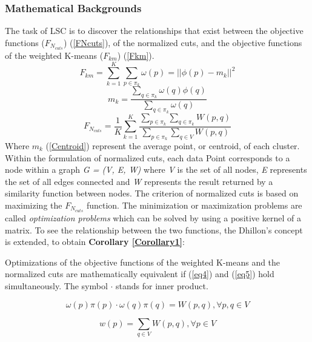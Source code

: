 \subsubsection{Mathematical Backgrounds}
The task of LSC is to discover the relationships that exist between the objective 
functions ($ F_{N_{cuts}} $) (\ref{FNcuts}), of the normalized cuts, and the objective functions 
of the weighted K-means ($ F_{km}$) (\ref{Fkm}). 
\begin{equation} \label{Fkm}
    F_{km} = \sum_{k=1}^K\sum_{p\in\pi_k}\omega(p)= || \phi(p)-m_k ||^2 
\end{equation}
\begin{equation} \label{Centroid}
    m_k = \frac{\sum_{q\in\pi_k}\omega(q)\phi(q)}{\sum_{q\in\pi_k}\omega(q)}
\end{equation}
\begin{equation} \label{FNcuts}
    F_{N_{cuts}} = \frac{1}{K}\sum_{k=1}^K\frac{\sum_{p\in\pi_k}\sum_{q\in\pi_k}W(p,q)}{\sum_{p\in\pi_k}\sum_{q\in{V}}W(p,q)}
\end{equation}
Where $ m_k $ (\ref{Centroid}) represent the average point, or centroid, of each cluster. Within 
the formulation of normalized cuts, each data Point corresponds to a node 
within a graph \emph{G = (V, E, W)} where \emph{V} is the set of all nodes, \emph{E} represents 
the set of all edges connected and \emph{W} represents the result returned by a 
similarity function between nodes. The criterion of normalized cuts is based 
on maximizing the $ F_{N_{cuts}} $ function. The minimization or maximization problems 
are called \emph{optimization problems} which can be solved by using a positive kernel of 
a matrix. To see the relationship between the two functions, the Dhillon's concept \cite{0781426526} is extended, to obtain {\bfseries Corollary \ref{Corollary1}}:

\begin{corollary} \label{Corollary1}
    Optimizations of the objective functions of the weighted K-means
    and the normalized cuts are mathematically equivalent if (\ref{eq4}) and (\ref{eq5}) 
    hold simultaneously. The symbol $ \cdot $ stands for inner product.
\end{corollary}

\begin{equation} \label{eq4}
    \omega(p)\pi(p) \cdot \omega(q)\pi(q) = W(p,q), \forall p,q \in V
\end{equation}

\begin{equation} \label{eq5}
    w(p) = \sum_{q \in V} W(p,q), \forall p \in V
\end{equation}

